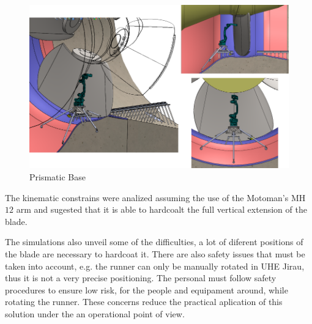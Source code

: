   
  \begin{figure}[h!]
   \centering
   \includegraphics[width=0.8\columnwidth]{figs/bases/base_p}
   \caption{Prismatic Base}
   \label{fig::base_p}
\end{figure}


  The kinematic constrains were analized assuming the use of the Motoman's
  MH$12$ arm and sugested that it is able to hardcoalt the full vertical
  extension of the blade.
  
  The simulations also unveil some of the difficulties, a lot of diferent
  positions of the blade are necessary to hardcoat it. There are also safety
  issues that must be taken into account, e.g. the runner can only be manually
  rotated in UHE Jirau, thus it is not a very precise positioning. The personal
  must follow safety procedures to ensure low risk, for the people and
  equipament around, while rotating the runner. These concerns reduce the
  practical aplication of this solution under the an operational point of view. 

